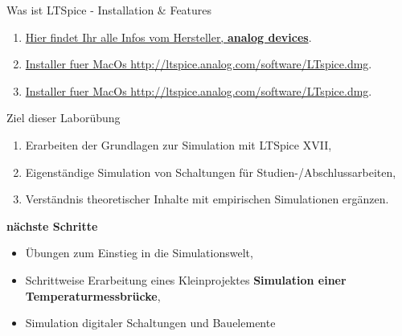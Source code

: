 \documentclass{beamer}
\begin{document}
   \begin{frame}[fragile]{Was ist LTSpice - Installation \& Features}
	
	\begin{enumerate}
\item \href{https://www.analog.com/en/design-center/design-tools-and-calculators/ltspice-simulator.html}{Hier findet Ihr alle Infos vom Hersteller, \textbf{analog devices}}.
\item \href{http://ltspice.analog.com/software/LTspice.dmg}{Installer fuer MacOs http://ltspice.analog.com/software/LTspice.dmg}.
\item \href{http://ltspice.analog.com/software/LTspice.dmg}{Installer fuer MacOs http://ltspice.analog.com/software/LTspice.dmg}.
	\end{enumerate}
	
\begin{center}


\end{center} 
\end{frame}

 \begin{frame}[fragile]{Ziel dieser Laborübung}

\begin{enumerate}
\item Erarbeiten der Grundlagen zur Simulation mit LTSpice XVII,
\item Eigenständige Simulation von Schaltungen für Studien-/Abschlussarbeiten,
\item Verständnis theoretischer Inhalte mit empirischen Simulationen ergänzen.
\end{enumerate}

\textbf{nächste Schritte}

\begin{itemize}
\item Übungen zum Einstieg in die Simulationswelt,
\item Schrittweise Erarbeitung eines Kleinprojektes \newline \textbf{Simulation einer Temperaturmessbrücke},
\item Simulation digitaler Schaltungen und Bauelemente
\end{itemize}

  \end{frame}
  
\end{document}
